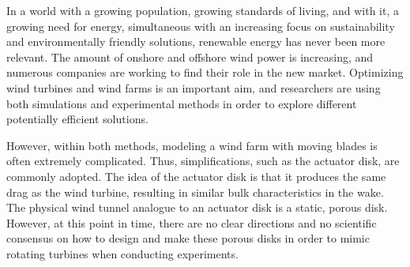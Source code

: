 In a world with a growing population, growing standards of living, and with it, a growing need for energy, simultaneous with an increasing focus on sustainability and environmentally friendly solutions, renewable energy has never been more relevant. The amount of onshore and offshore wind power is increasing, and numerous companies are working to find their role in the new market. Optimizing wind turbines and wind farms is an important aim, and researchers are using both simulations and experimental methods in order to explore different potentially efficient solutions. 

However, within both methods, modeling a wind farm with moving blades is often extremely complicated. Thus, simplifications, such as the actuator disk, are commonly adopted. The idea of the actuator disk is that it produces the same drag as the wind turbine, resulting in similar bulk characteristics in the wake. The physical wind tunnel analogue to an actuator disk is a static, porous disk. However, at this point in time, there are no clear directions and no scientific consensus on how to design and make these porous disks in order to mimic rotating turbines when conducting experiments.  

